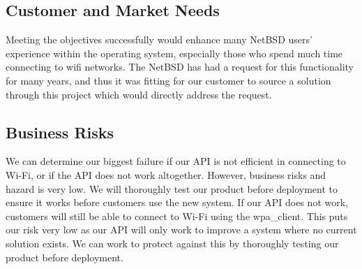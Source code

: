 \subsection{Customer and Market Needs}

Meeting the objectives successfully would enhance many NetBSD users' experience within the operating system, especially those who spend much time connecting to wifi networks. The NetBSD has had a request for this functionality for many years, and thus it was fitting for our customer to source a solution through this project which would directly address the request.

\subsection{Business Risks}

We can determine our biggest failure if our API is not efficient in connecting to Wi-Fi, or if the API does not work altogether. However, business risks 
and hazard is very low. We will thoroughly test our product before deployment to ensure it works before customers use the new system. If our API does not work, 
customers will still be able to connect to Wi-Fi using the wpa\_client. This puts our risk very low as our API will only work to improve a system where no current 
solution exists. We can work to protect against this by thoroughly testing our product before deployment. 

